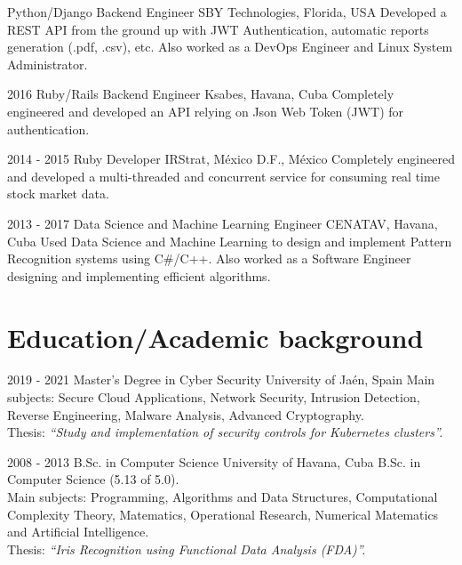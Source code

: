 \documentclass[]{friggeri-cv}
\begin{document}
\begin{entrylist}
  \entry
    {}
    {Python/Django Backend Engineer}
    {SBY Technologies, Florida, USA}
    {Developed a REST API from the ground up with JWT Authentication, automatic reports generation (.pdf, .csv), etc. Also worked as a DevOps Engineer and Linux System Administrator.\\}    

  \entry
    {2016}
    {Ruby/Rails Backend Engineer}
    {Ksabes, Havana, Cuba}
    {Completely engineered and developed an API relying on Json Web Token (JWT) for authentication.\\}
  
  \entry
    {2014 - 2015}
    {Ruby Developer}
    {IRStrat, México D.F., México}
    {Completely engineered and developed a multi-threaded and concurrent service for consuming real time stock market data.\\}
\end{entrylist}

\begin{entrylist}
  \entry
    {2013 - 2017}
    {Data Science and Machine Learning Engineer}
    {CENATAV, Havana, Cuba}
    {Used Data Science and Machine Learning to design and implement Pattern Recognition systems using C\#/C++. Also worked as a Software Engineer designing and implementing efficient algorithms.\\}
\end{entrylist}

\section{Education/Academic background}
\begin{entrylist}
  \entry
    {2019 - 2021}
    {Master's Degree in Cyber Security}
    {University of Jaén, Spain}
    {
    	Main subjects: Secure Cloud Applications, Network Security, Intrusion Detection, Reverse Engineering, Malware Analysis, Advanced Cryptography.\\
      Thesis: \emph{``Study and implementation of security controls for Kubernetes clusters''.}\\
    }

  \entry
    {2008 - 2013}
    {B.Sc. in Computer Science}
    {University of Havana, Cuba}
    {B.Sc. in Computer Science (5.13 of 5.0).\\ Main subjects: Programming, Algorithms and Data Structures, Computational Complexity Theory, Matematics, Operational Research, Numerical Matematics and Artificial Intelligence.\\
    Thesis: \emph{``Iris Recognition using Functional Data Analysis (FDA)''.}}

\end{entrylist}
\end{document}
